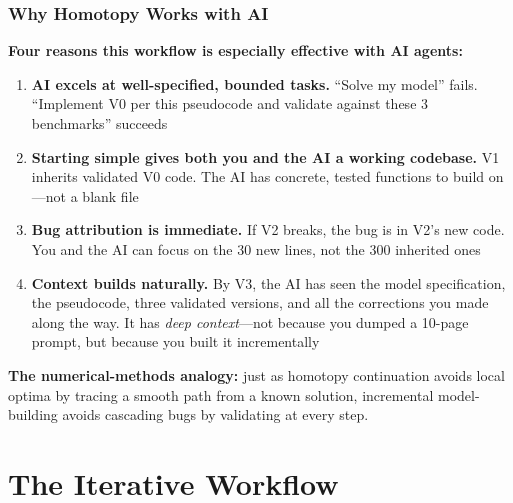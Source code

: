 \documentclass[10pt,english,aspectratio=169]{beamer}
\begin{document}
\begin{frame}
\frametitle{Why Homotopy Works with AI}

\textbf{Four reasons this workflow is especially effective with AI agents:}

\vspace{0.3cm}

\begin{enumerate}
    \item \textbf{AI excels at well-specified, bounded tasks.} ``Solve my model'' fails. ``Implement V0 per this pseudocode and validate against these 3 benchmarks'' succeeds
    \vspace{0.15cm}
    \item \textbf{Starting simple gives both you and the AI a working codebase.} V1 inherits validated V0 code. The AI has concrete, tested functions to build on---not a blank file
    \vspace{0.15cm}
    \item \textbf{Bug attribution is immediate.} If V2 breaks, the bug is in V2's new code. You and the AI can focus on the 30 new lines, not the 300 inherited ones
    \vspace{0.15cm}
    \item \textbf{Context builds naturally.} By V3, the AI has seen the model specification, the pseudocode, three validated versions, and all the corrections you made along the way. It has \textit{deep context}---not because you dumped a 10-page prompt, but because you built it incrementally
\end{enumerate}

\vspace{0.3cm}

\textbf{The numerical-methods analogy:} just as homotopy continuation avoids local optima by tracing a smooth path from a known solution, incremental model-building avoids cascading bugs by validating at every step.
\end{frame}

\section{The Iterative Workflow}
\end{document}
